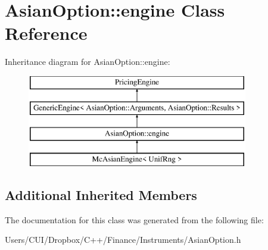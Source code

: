 \hypertarget{class_asian_option_1_1engine}{}\section{Asian\+Option\+:\+:engine Class Reference}
\label{class_asian_option_1_1engine}
Inheritance diagram for Asian\+Option\+:\+:engine\+:\begin{figure}[H]
\begin{center}
\leavevmode
\includegraphics[height=4.000000cm]{class_asian_option_1_1engine}
\end{center}
\end{figure}
\subsection*{Additional Inherited Members}


The documentation for this class was generated from the following file\+:\begin{DoxyCompactItemize}
\item 
Users/\+C\+U\+I/\+Dropbox/\+C++/\+Finance/\+Instruments/Asian\+Option.\+h\end{DoxyCompactItemize}
